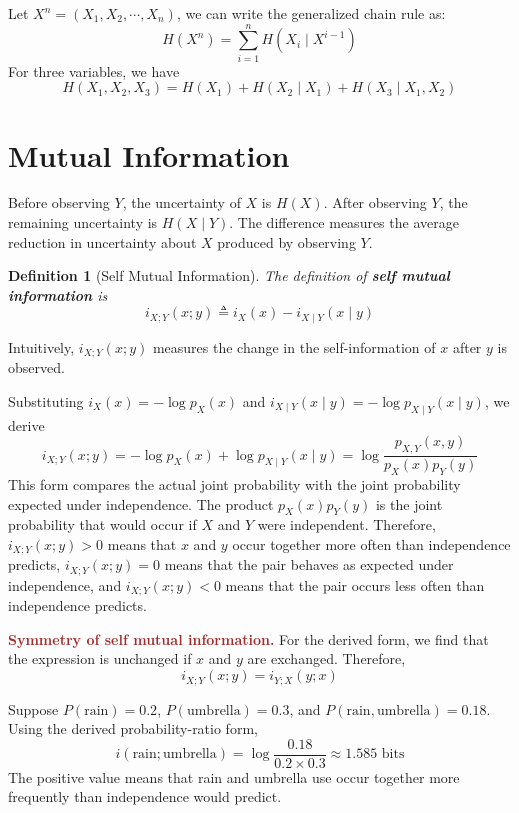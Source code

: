 \documentclass[11pt]{report}
\theoremstyle{lecturedefinition}
\newtheorem{definition}{Definition}
\theoremstyle{lectureremark}
\begin{document}
Let $X^n=(X_1, X_2,\cdots, X_n)$, we can write the generalized chain rule as:
\begin{equation}
    H(X^n)=\sum_{i=1}^nH(X_i\mid X^{i-1})
\end{equation}
For three variables, we have
\begin{equation*}
    H(X_1, X_2, X_3)=H(X_1)+H(X_2\mid X_1)+H(X_3\mid X_1, X_2)
\end{equation*}

\section{Mutual Information}
Before observing $Y$, the uncertainty of $X$ is $H(X)$. After observing $Y$, the remaining uncertainty is $H(X\mid Y)$. The difference measures the average reduction in uncertainty about $X$ produced by observing $Y$.
\begin{definition}[Self Mutual Information]
The definition of \textbf{self mutual information} is
\begin{equation*}
    i_{X;Y}(x;y)\triangleq i_X(x)-i_{X\mid Y}(x\mid y)
\end{equation*}
\end{definition}
Intuitively, $i_{X;Y}(x;y)$ measures the change in the self-information of \(x\) after \(y\) is observed.

Substituting $i_X(x)=-\log p_X(x)$ and $i_{X\mid Y}(x\mid y)=-\log p_{X\mid Y}(x\mid y)$, we derive
\begin{equation*}
    i_{X;Y}(x;y)=-\log p_X(x)+\log p_{X\mid Y}(x\mid y)
    =\log \frac{p_{X,Y}(x,y)}{p_X(x)p_Y(y)}
\end{equation*}
This form compares the actual joint probability with the joint probability expected under independence. The product $p_X(x)p_Y(y)$ is the joint probability that would occur if $X$ and $Y$ were independent. Therefore, $i_{X;Y}(x;y)>0$ means that $x$ and $y$ occur together more often than independence predicts, $i_{X;Y}(x;y)=0$ means that the pair behaves as expected under independence, and $i_{X;Y}(x;y)<0$ means that the pair occurs less often than independence predicts. 

\textbf{\textcolor{brown}{Symmetry of self mutual information.}} For the derived form, we find that the expression is unchanged if $x$ and $y$ are exchanged. Therefore,
\begin{equation}
    i_{X;Y}(x;y)=i_{Y;X}(y;x)
\end{equation}
\begin{ExampleBox}
Suppose $P(\text{rain})=0.2$, $P(\text{umbrella})=0.3$, and $P(\text{rain}, \text{umbrella})=0.18$. Using the derived probability-ratio form,
\begin{equation*}
    i(\text{rain};\text{umbrella})=\log\frac{0.18}{0.2\times 0.3}\approx1.585\text{ bits}
\end{equation*}
The positive value means that rain and umbrella use occur together more frequently than independence would predict.
\end{ExampleBox}
\end{document}
